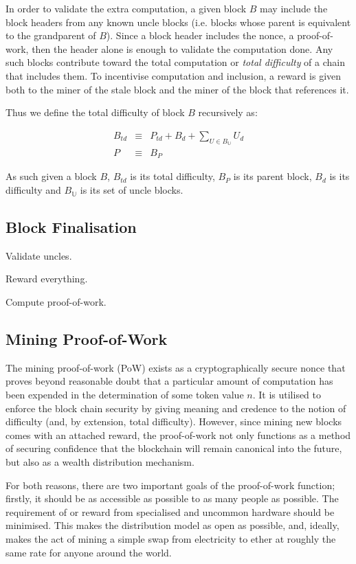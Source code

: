 \documentclass[9pt,oneside]{amsart}
\begin{document}
\begin{multicols}{2}
In order to validate the extra computation, a given block $B$ may include the block headers from any known uncle blocks (i.e. blocks whose parent is equivalent to the grandparent of $B$). Since a block header includes the nonce, a proof-of-work, then the header alone is enough to validate the computation done. Any such blocks contribute toward the total computation or \textit{total difficulty} of a chain that includes them. To incentivise computation and inclusion, a reward is given both to the miner of the stale block and the miner of the block that references it.

Thus we define the total difficulty of block $B$ recursively as:

\begin{eqnarray}
B_{td} & \equiv & P_{td} + B_d + \sum\limits_{U \in B_\mathbb{U}} U_d \\
P & \equiv & B_P
\end{eqnarray}

As such given a block $B$, $B_{td}$ is its total difficulty, $B_P$ is its parent block, $B_d$ is its difficulty and $B_\mathbb{U}$ is its set of uncle blocks.

\subsection{Block Finalisation} \label{ch:finalisation}

Validate uncles.

Reward everything.

Compute proof-of-work.

\subsection{Mining Proof-of-Work} \label{ch:pow}

The mining proof-of-work (PoW) exists as a cryptographically secure nonce that proves beyond reasonable doubt that a particular amount of computation has been expended in the determination of some token value $n$. It is utilised to enforce the block chain security by giving meaning and credence to the notion of difficulty (and, by extension, total difficulty). However, since mining new blocks comes with an attached reward, the proof-of-work not only functions as a method of securing confidence that the blockchain will remain canonical into the future, but also as a wealth distribution mechanism.

For both reasons, there are two important goals of the proof-of-work function; firstly, it should be as accessible as possible to as many people as possible. The requirement of or reward from specialised and uncommon hardware should be minimised. This makes the distribution model as open as possible, and, ideally, makes the act of mining a simple swap from electricity to ether at roughly the same rate for anyone around the world.


\end{multicols}
\end{document}
